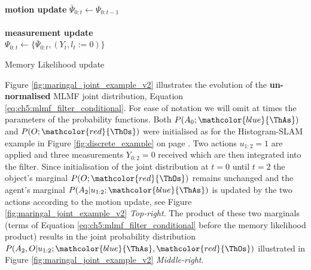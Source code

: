 \begin{center}
\begin{minipage}{.65\linewidth}

\begin{algorithm}[H]
\label{alg:memory-motion}

\BlankLine
\nonl\hrulefill\\
\nonl\textbf{motion update} $\bar{\Psi}_{0:t} \gets \Psi_{0:t-1}$ \label{alg:ch5:motion_memory}\\
\nonl\hrulefill\\
\nonl\textbf{measurement update}\\
$\Psi_{0:t} \gets \{\bar{\Psi}_{0:t}, (Y_t,l_t:=0)\}$ 
\caption{Memory Likelihood update}

\end{algorithm} 
\end{minipage}
\end{center}

Figure \ref{fig:maringal_joint_example_v2} illustrates the evolution of the \textbf{un-normalised} MLMF joint distribution, Equation  \ref{eq:ch5:mlmf_filter_conditional}.
For ease of notation we will omit at times the parameters of the probability functions.
Both $P(A_0;\mathcolor{blue}{\ThAs})$ and $P(O;\mathcolor{red}{\ThOs})$ were initialised as for the Histogram-SLAM example in Figure \ref{fig:discrete_example} on page \pageref{fig:discrete_example}.
Two actions $u_{1:2}=1$ are applied and three measurements $Y_{0:2} = 0$ received which are then integrated into the filter. 
Since initialisation of the joint distribution at $t=0$ until $t=2$ the object's marginal $P(O;\mathcolor{red}{\ThOs})$ remains unchanged and the agent's 
marginal $P(A_2|u_{1:2};\mathcolor{blue}{\ThAs})$ is updated by the two actions according to the motion update, see 
Figure \ref{fig:maringal_joint_example_v2} \textit{Top-right}.
The product of these two marginals (terms of Equation \ref{eq:ch5:mlmf_filter_conditional} before the memory likelihood product) results in the joint
probability distribution $P(A_2,O|u_{1:2};\mathcolor{blue}{\ThAs},\mathcolor{red}{\ThOs})$ illustrated in 
Figure \ref{fig:maringal_joint_example_v2} \textit{Middle-right}. 


